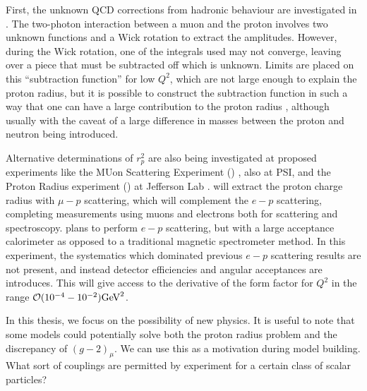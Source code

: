 First, the unknown QCD corrections from hadronic behaviour are investigated in \cite{Carlson:2015jba}.
The two-photon interaction between a muon and the proton involves two unknown functions and a Wick rotation to extract the amplitudes.
However, during the Wick rotation, one of the integrals used may not converge, leaving over a piece that must be subtracted off which is unknown.
Limits are placed on this ``subtraction function'' for low $Q^2$, which are not large enough to explain the proton radius, but it is possible to construct the subtraction function in such a way that one can have a large contribution to the proton radius \cite{Miller:2012ne}, although usually with the caveat of a large difference in masses between the proton and neutron being introduced.

Alternative determinations of $r_p^2$ are also being investigated at proposed experiments like the MUon Scattering Experiment (\muse) \cite{Mesick:2015gta}, also at PSI, and the Proton Radius experiment (\prad) at Jefferson Lab \cite{Gasparian:2014rna}. 
\muse will extract the proton charge radius with $\mu-p$ scattering, which will complement the $e-p$ scattering, completing measurements using muons and electrons both for scattering and spectroscopy.
\prad plans to perform $e-p$ scattering, but with a large acceptance calorimeter as opposed to a traditional magnetic spectrometer method.
In this experiment, the systematics which dominated previous $e-p$ scattering results are not present, and instead detector efficiencies and angular acceptances are introduces.
This will give access to the derivative of the form factor for $Q^2$ in the range $\operatorname{\mathcal{O}}(10^{-4} - 10^{-2})\textrm{GeV}^2$.

In this thesis, we focus on the possibility of new physics.
It is useful to note that some models could potentially solve both the proton radius problem and the discrepancy of $(g-2)_\mu$.
We can use this as a motivation during model building.
What sort of couplings are permitted by experiment for a certain class of scalar particles?
